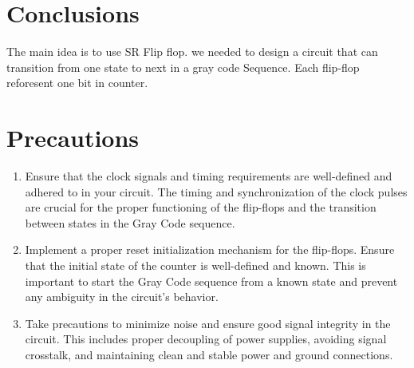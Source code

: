 \documentclass[12pt]{article}
\begin{document}
    
    
    
    

    
\section{Conclusions}
    The main idea is to use SR Flip flop. we needed to design a circuit that can transition from one state to next in a gray code Sequence. Each flip-flop reforesent one bit in counter.
\section{Precautions}
    \begin{enumerate}
        \item Ensure that the clock signals and timing requirements are well-defined and adhered to in your circuit. The timing and synchronization of the clock pulses are crucial for the proper functioning of the flip-flops and the transition between states in the Gray Code sequence.
        \item  Implement a proper reset initialization mechanism for the flip-flops. Ensure that the initial state of the counter is well-defined and known. This is important to start the Gray Code sequence from a known state and prevent any ambiguity in the circuit's behavior.
        \item Take precautions to minimize noise and ensure good signal integrity in the circuit. This includes proper decoupling of power supplies, avoiding signal crosstalk, and maintaining clean and stable power and ground connections.
    \end{enumerate}
\end{document}
